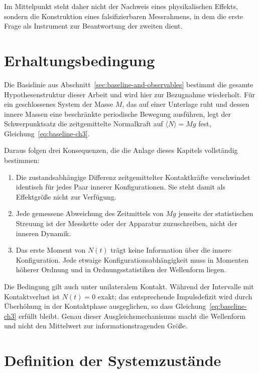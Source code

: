 \documentclass[12pt,a4paper]{report}
\begin{document}
Im Mittelpunkt steht daher nicht der Nachweis eines physikalischen
Effekts, sondern die Konstruktion eines falsifizierbaren Messrahmens, in
dem die erste Frage als Instrument zur Beantwortung der zweiten dient.

\section{Erhaltungsbedingung}
\label{sec:conservation-constraint}

Die Basislinie aus Abschnitt~\ref{sec:baseline-and-observables} bestimmt
die gesamte Hypothesenstruktur dieser Arbeit und wird hier zur
Bezugnahme wiederholt. Für ein geschlossenes System der Masse $M$, das
auf einer Unterlage ruht und dessen innere Massen eine beschränkte
periodische Bewegung ausführen, legt der Schwerpunktsatz die
zeitgemittelte Normalkraft auf $\langle N \rangle = Mg$ fest,
Gleichung~\eqref{eq:baseline-ch3}.

Daraus folgen drei Konsequenzen, die die Anlage dieses Kapitels
vollständig bestimmen:

\begin{enumerate}
  \item Die zustandsabhängige Differenz zeitgemittelter Kontaktkräfte
        verschwindet identisch für jedes Paar innerer Konfigurationen.
        Sie steht damit als Effektgröße nicht zur Verfügung.
  \item Jede gemessene Abweichung des Zeitmittels von $Mg$ jenseits der
        statistischen Streuung ist der Messkette oder der Apparatur
        zuzuschreiben, nicht der inneren Dynamik.
  \item Das erste Moment von $N(t)$ trägt keine Information über die
        innere Konfiguration. Jede etwaige Konfigurationsabhängigkeit
        muss in Momenten höherer Ordnung und in Ordnungsstatistiken der
        Wellenform liegen.
\end{enumerate}

Die Bedingung gilt auch unter unilateralem Kontakt. Während der
Intervalle mit Kontaktverlust ist $N(t) = 0$ exakt; das entsprechende
Impulsdefizit wird durch Überhöhung in der Kontaktphase ausgeglichen, so
dass Gleichung~\eqref{eq:baseline-ch3} erfüllt bleibt. Genau dieser
Ausgleichsmechanismus macht die Wellenform und nicht den Mittelwert zur
informationstragenden Größe.

\section{Definition der Systemzustände}
\end{document}
